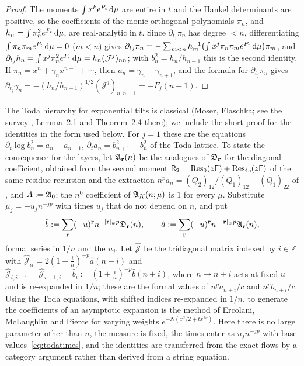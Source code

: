 \begin{proof}
The moments $\int x^ke^{P_t}\,\mathrm{d}\mu$ are entire in $t$ and the Hankel determinants are positive, so the coefficients of the monic
orthogonal polynomials $\pi_n$, and $h_n=\int\pi_n^2e^{P_t}\,\mathrm{d}\mu$, are real-analytic in $t$. Since $\partial_{t_j}\pi_n$ has degree $<n$,
differentiating $\int\pi_n\pi_me^{P_t}\,\mathrm{d}\mu=0$ ($m<n$) gives $\partial_{t_j}\pi_n=-\sum_{m<n}h_m^{-1}\bigl(\int x^j\pi_n\pi_me^{P_t}\,\mathrm{d}\mu\bigr)\pi_m$,
and $\partial_{t_j}h_n=\int x^j\pi_n^2e^{P_t}\,\mathrm{d}\mu=h_n(\mathcal J^j)_{nn}$; with $b_n^2=h_n/h_{n-1}$ this is the second identity. If
$\pi_n=x^n+\gamma_nx^{n-1}+\dotsb$, then $a_n=\gamma_n-\gamma_{n+1}$, and the formula for $\partial_{t_j}\pi_n$ gives
$\partial_{t_j}\gamma_n=-(h_n/h_{n-1})^{1/2}(\mathcal J^j)_{n,n-1}=-F_j(n-1)$.
\end{proof}

The Toda hierarchy for exponential tilts is classical (Moser, Flaschka; see the survey \cite{VanAsscheToda}, Lemma~2.1 and
Theorem~2.4 there); we include the short proof for the identities in the form used below. For $j=1$ these are the equations $\partial_t\log b_n^2=a_n-a_{n-1}$, $\partial_ta_n=b_{n+1}^2-b_n^2$ of the Toda lattice. To state the
consequence for the layers, let $\mathfrak A_{\mathbf r}(n)$ be the analogues of $\mathfrak D_{\mathbf r}$ for the diagonal coefficient, obtained from the second
moment $\mathsf R_2=\operatorname{Res}_0(z\mathsf F)+\operatorname{Res}_{4c}(z\mathsf F)$ of the same residue recursion and the extraction
$n^pa_n=(Q_2)_{12}/(Q_1)_{12}-(Q_1)_{22}$ of \cite{PaperII}, and $A:=\mathfrak A_0$; the $n^0$ coefficient of $\mathfrak A_K(n;\mu)$ is $1$ for every
$\mu$. Substitute $\mu_j=-u_jn^{-jp}$ with times $u_j$ that do not depend on $n$, and put
\[
  \hat b:=\sum_{\mathbf r}(-u)^{\mathbf r}n^{-|\mathbf r|_wp}\mathfrak D_{\mathbf r}(n),\qquad\hat a:=\sum_{\mathbf r}(-u)^{\mathbf r}n^{-|\mathbf r|_wp}\mathfrak A_{\mathbf r}(n),
\]
formal series in $1/n$ and the $u_j$. Let $\hat{\mathcal J}$ be the tridiagonal matrix indexed by $i\in\mathbb Z$ with
$\hat{\mathcal J}_{ii}=2(1+\frac in)^{-p}\hat a(n+i)$ and $\hat{\mathcal J}_{i,i-1}=\hat{\mathcal J}_{i-1,i}=\hat b_i:=(1+\frac in)^{-p}\hat b(n+i)$,
where $n\mapsto n+i$ acts at fixed $u$ and is re-expanded in $1/n$; these are the formal values of $n^pa_{n+i}/c$ and $n^pb_{n+i}/c$.
Using the Toda equations, with shifted indices re-expanded in $1/n$, to generate the coefficients of an asymptotic expansion is the
method of Ercolani, McLaughlin and Pierce \cite[Section~4]{EMP} for varying weights $e^{-N(x^2/2+tx^{2\nu})}$. Here there is no large
parameter other than $n$, the measure is fixed, the times enter as $u_jn^{-jp}$ with base values~\eqref{eq:todatimes}, and the
identities are transferred from the exact flows by a category argument rather than derived from a string equation.


